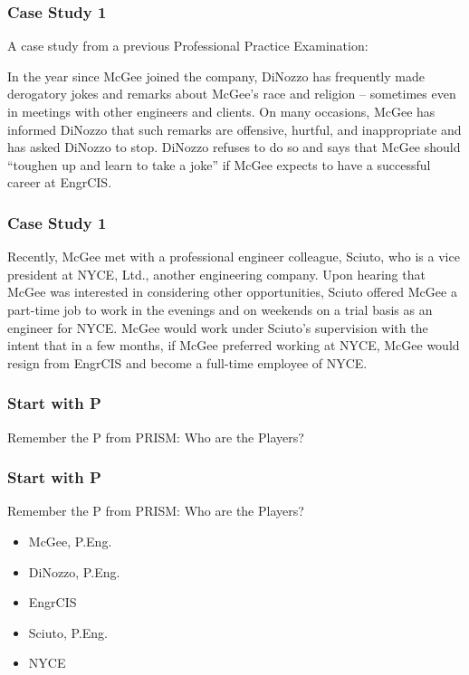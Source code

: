 \begin{frame}
\frametitle{Case Study 1}

A case study from a previous Professional Practice Examination:


In the year since McGee joined the company, DiNozzo has frequently made derogatory jokes and remarks about McGee's race and religion -- sometimes even in meetings with other engineers and clients. On many occasions, McGee has informed DiNozzo that such remarks are offensive, hurtful, and inappropriate and has asked DiNozzo to stop.  DiNozzo refuses to do so and says that McGee should ``toughen up and learn to take a joke'' if McGee expects to have a successful career at EngrCIS. 
\end{frame}



\begin{frame}
\frametitle{Case Study 1}


Recently, McGee met with a professional engineer colleague, Sciuto, who is a vice president at NYCE, Ltd., another engineering company.  Upon hearing that McGee was interested in considering other opportunities, Sciuto offered McGee a part-time job to work in the evenings and on weekends on a trial basis as an engineer for NYCE.  McGee would work under Sciuto's supervision with the intent that in a few months, if McGee preferred working at NYCE, McGee would resign from EngrCIS and become a full-time employee of NYCE.



\end{frame}



\begin{frame}
\frametitle{Start with P}

Remember the P from PRISM: Who are the Players?


\end{frame}


\begin{frame}
\frametitle{Start with P}

Remember the P from PRISM: Who are the Players?

\begin{itemize}
	\item McGee, P.Eng.
	\item DiNozzo, P.Eng.
	\item EngrCIS
	\item Sciuto, P.Eng.
	\item NYCE
\end{itemize}


\end{frame}



